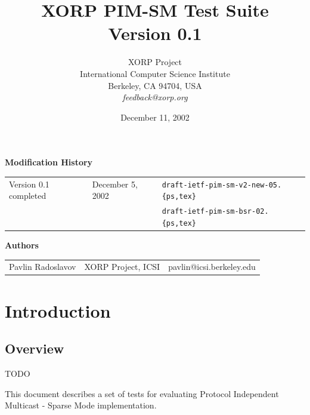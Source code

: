 \documentclass[11pt]{report}
\begin{document}
\title{XORP PIM-SM Test Suite \\
\vspace{1ex}
Version 0.1}
\author{ XORP Project                                   \\
         International Computer Science Institute       \\
         Berkeley, CA 94704, USA                        \\
         {\it feedback@xorp.org}
}
\date{December 11, 2002}

\maketitle

\thispagestyle{empty}


\newpage
\thispagestyle{empty}
{\huge \bf Modification History}
\vspace{4ex}

\begin{tabular}{lll}
Version 0.1 completed	& December 5, 2002 & \verb=draft-ietf-pim-sm-v2-new-05.{ps,tex}= \\
			&		   & \verb=draft-ietf-pim-sm-bsr-02.{ps,tex}=
\end{tabular}

\newpage
{\huge \bf Authors}
\vspace{4ex}

\begin{tabular}{lll}
Pavlin Radoslavov	& XORP Project, ICSI & pavlin@icsi.berkeley.edu
\end{tabular}

\tableofcontents
\listoftables
\listoffigures

\setcounter{chapter}{-1}
\chapter{Introduction}

\section{Overview}

TODO

This document describes a set of tests for evaluating Protocol Independent
Multicast - Sparse Mode implementation.
\end{document}
